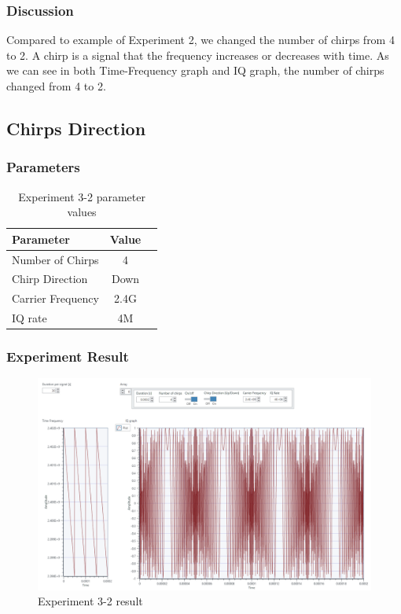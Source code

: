     \subsubsection*{Discussion}
    Compared to example of Experiment 2, we changed the number of chirps from 4 to 2. A chirp is a signal that the frequency increases or decreases with time. As we can see in both Time-Frequency graph and IQ graph, the number of chirps changed from 4 to 2. \\
\clearpage    

    
\subsection{Chirps Direction}
    \subsubsection*{Parameters}
    \begin{table}[!h]\centering
        \hspace{10mm}
        \begin{tabular}{|l|c|c|}
        \hline
        \multicolumn{1}{|l|}{Parameter} & \multicolumn{1}{l|}{Value} \\
        \hline
        Number of Chirps & 4 \\ 
        \hline
        Chirp Direction & Down \\ 
        \hline
        Carrier Frequency & 2.4G \\ 
        \hline
        IQ rate & 4M \\ 
        \hline
        \end{tabular}
        \caption{Experiment 3-2 parameter values}
    \end{table}
    
    \subsubsection*{Experiment Result}
    \vspace{-4mm}  
    \begin{figure}[!h]\raggedleft
    \hspace{15mm}
		\includegraphics[width=.95\textwidth]{image/week03/3-2-1.png}
		\caption{\footnotesize Experiment 3-2 result}
		\vspace{-10pt}
    \end{figure}
    
